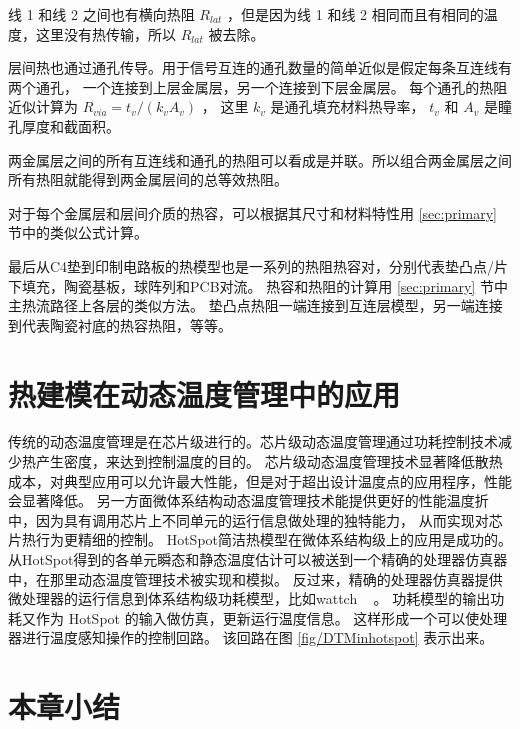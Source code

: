 线 1 和线 2 之间也有横向热阻 $R_{lat}$ ，但是因为线 1 和线 2 相同而且有相同的温度，这里没有热传输，所以 $R_{lat}$ 被去除。

层间热也通过通孔传导。用于信号互连的通孔数量的简单近似是假定每条互连线有两个通孔，
一个连接到上层金属层，另一个连接到下层金属层。
每个通孔的热阻近似计算为 $R_{via} = t_v/(k_vA_v)$ ， 这里 $k_v$ 是通孔填充材料热导率， $t_v$ 和 $A_v$ 是瞳孔厚度和截面积。

两金属层之间的所有互连线和通孔的热阻可以看成是并联。所以组合两金属层之间所有热阻就能得到两金属层间的总等效热阻。

对于每个金属层和层间介质的热容，可以根据其尺寸和材料特性用 \ref{sec:primary} 节中的类似公式计算。

最后从C4垫到印制电路板的热模型也是一系列的热阻热容对，分别代表垫凸点/片下填充，陶瓷基板，球阵列和PCB对流。
热容和热阻的计算用 \ref{sec:primary} 节中主热流路径上各层的类似方法。
垫凸点热阻一端连接到互连层模型，另一端连接到代表陶瓷衬底的热容热阻，等等。

\section{热建模在动态温度管理中的应用}\label{sec:hotspotinDTM}

传统的动态温度管理是在芯片级进行的。芯片级动态温度管理通过功耗控制技术减少热产生密度，来达到控制温度的目的。
芯片级动态温度管理技术显著降低散热成本，对典型应用可以允许最大性能，但是对于超出设计温度点的应用程序，性能会显著降低。
另一方面微体系结构动态温度管理技术能提供更好的性能温度折中，因为具有调用芯片上不同单元的运行信息做处理的独特能力，
从而实现对芯片热行为更精细的控制。
HotSpot简洁热模型在微体系结构级上的应用是成功的。
从HotSpot得到的各单元瞬态和静态温度估计可以被送到一个精确的处理器仿真器中，在那里动态温度管理技术被实现和模拟。
反过来，精确的处理器仿真器提供微处理器的运行信息到体系结构级功耗模型，比如wattch ~\cite{Brooks:ISCA'00} 。
功耗模型的输出功耗又作为 HotSpot 的输入做仿真，更新运行温度信息。
这样形成一个可以使处理器进行温度感知操作的控制回路。
该回路在图 \ref{fig/DTMinhotspot} 表示出来。\\


\section{本章小结}\label{sec:xiaojie3}

